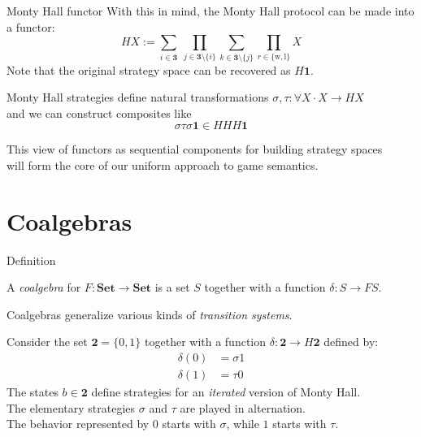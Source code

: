 \documentclass[aspectratio=1610,mathserif]{beamer}
\begin{document}
\begin{frame}{Monty Hall functor} %
  With this in mind,
  the Monty Hall protocol can be made into a functor:
  \[
    H X := 
    \sum_{i \in \mathbf{3}} \:
    \prod_{j \in \mathbf{3} \setminus \{ i \}}
    \sum_{k \in \mathbf{3} \setminus \{ j \}}
    \prod_{r \in \{\text{w}, \text{l}\}}
    X
  \]
  Note that the original strategy space can be recovered as $H \mathbf{1}$.

  \pause
  \vspace{1em}
  Monty Hall strategies define natural transformations
  $
    \sigma , \tau: \forall X \cdot X \rightarrow HX
  $ \\
  and we can construct composites like
  \[
    \sigma \tau \sigma \mathbf{1} \in HHH\mathbf{1}
  \] 

  \pause
  This view of functors as sequential components
  for building strategy spaces \\
  will form the core of our uniform approach to game semantics.
\end{frame}


\section{Coalgebras} %
\frame\sectionpage

\begin{frame}{Definition} %
  \begin{definition}[$F$-Coalgebra]
    A \emph{coalgebra} for $F : \mathbf{Set} \rightarrow \mathbf{Set}$
    is a set $S$ together with a function $\delta : S \rightarrow FS$.
  \end{definition}
  Coalgebras generalize various kinds of \emph{transition systems}.

  \pause\vfill
  Consider the set $\mathbf{2} = \{0, 1\}$
  together with a function $\delta : \mathbf{2} \rightarrow H\mathbf{2}$
  defined by:
  \begin{align*}
    \delta(0) &= \sigma 1 \\
    \delta(1) &= \tau 0
  \end{align*} 
  The states $b \in \mathbf{2}$ define strategies
  for an \emph{iterated} version of Monty Hall. \\
  The elementary strategies $\sigma$ and $\tau$ are played in alternation. \\
  The behavior represented by $0$ starts with $\sigma$,
  while $1$ starts with $\tau$.
\end{frame}
\end{document}
